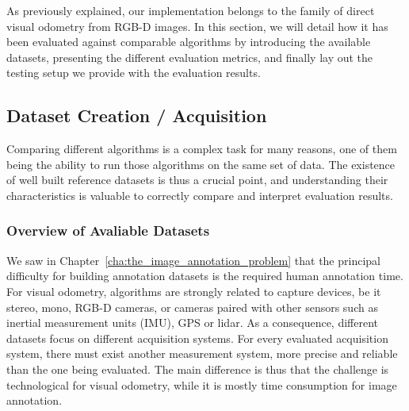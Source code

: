 As previously explained, our implementation
belongs to the family of direct visual odometry from RGB-D images.
In this section, we will detail how it has been evaluated against
comparable algorithms by introducing the available datasets,
presenting the different evaluation metrics,
and finally lay out the testing setup we provide with the evaluation results.

\subsection{Dataset Creation / Acquisition}%
\label{sub:dataset_creation}

Comparing different algorithms is a complex task for many reasons,
one of them being the ability to run those algorithms on the same set of data.
The existence of well built reference datasets is thus a crucial point,
and understanding their characteristics is valuable to correctly compare and interpret
evaluation results.

\subsubsection{Overview of Avaliable Datasets}%
\label{ssub:datasets_overview}

We saw in Chapter~\ref{cha:the_image_annotation_problem} that the principal
difficulty for building annotation datasets is the required human annotation time.
For visual odometry, algorithms are strongly related to capture devices,
be it stereo, mono, RGB-D cameras, or cameras paired with other sensors
such as inertial measurement units (IMU), GPS or lidar.
As a consequence, different datasets focus on different acquisition systems.
For every evaluated acquisition system, there must exist another measurement system,
more precise and reliable than the one being evaluated.
The main difference is thus that
the challenge is technological for visual odometry,
while it is mostly time consumption for image annotation.


